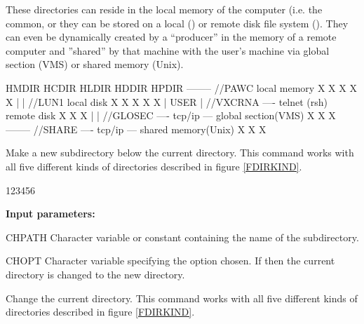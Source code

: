 These \HBOOK{} directories can reside in the local memory
of the computer (i.e. the  common,
or they can be stored on a local () or
remote disk file system ().
They can even be dynamically created by a ``producer'' in
the memory of a remote computer and ''shared'' by
that machine with the user's machine via global section (VMS)
or shared memory (Unix).

\begin{Fighere}
\begin{XMP}
                                                          HMDIR HCDIR HLDIR HDDIR HPDIR
--------    //PAWC                     local memory         X     X     X     X     X
|      |    //LUN1                     local disk           X     X     X     X     X
| USER |    //VXCRNA ---- telnet (rsh) remote disk          X     X     X
|      |    //GLOSEC ---- tcp/ip ---   global section(VMS)  X     X     X
--------    //SHARE  ---- tcp/ip ---   shared memory(Unix)  X     X     X
\end{XMP}
\caption[Different kinds of HBOOK directories]%
        {Different kinds of \HBOOK{} directories}
\label{FDIRKIND}
\end{Fighere}

\finalnewpage
{}
 
\Action
Make a new subdirectory below the current directory. 
This command works with all five different kinds of directories 
described in figure \ref{FDIRKIND}.
 
\begin{DLtt}{123456}
\item[{\rm\bf Input parameters:}]
\item[CHPATH] Character
variable or constant containing the name of the subdirectory.
\item[CHOPT] Character variable specifying the option chosen.
If  then the current directory is changed to the new
directory.
\end{DLtt}
 

 
\Action
Change the current directory.
This command works with all five different kinds of directories 
described in figure \ref{FDIRKIND}.
 
